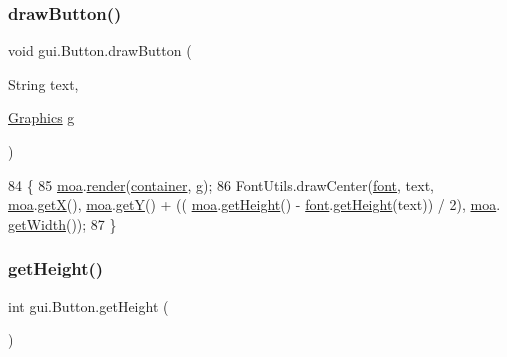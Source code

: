 \subsubsection{\texorpdfstring{draw\+Button()}{drawButton()}}
{\footnotesize\ttfamily void gui.\+Button.\+draw\+Button (\begin{DoxyParamCaption}\item[{String}]{text,  }\item[{\mbox{\hyperlink{classorg_1_1newdawn_1_1slick_1_1_graphics}{Graphics}}}]{g }\end{DoxyParamCaption})\hspace{0.3cm}{\ttfamily [inline]}}


\begin{DoxyCode}
84                                                     \{
85         \mbox{\hyperlink{classgui_1_1_button_abccfc83b8fee5280bf5022b3b211054e}{moa}}.\mbox{\hyperlink{classorg_1_1newdawn_1_1slick_1_1gui_1_1_mouse_over_area_a37b442cacc81eec200efb0fa76d86fe0}{render}}(\mbox{\hyperlink{classgui_1_1_button_a91cd8f6ba1fa010f564dcbc4561ce9a7}{container}}, g);
86         FontUtils.drawCenter(\mbox{\hyperlink{classgui_1_1_button_a7f22b2fc3bd45d47a55a2d3ef20e5452}{font}}, text, \mbox{\hyperlink{classgui_1_1_button_abccfc83b8fee5280bf5022b3b211054e}{moa}}.\mbox{\hyperlink{classorg_1_1newdawn_1_1slick_1_1gui_1_1_mouse_over_area_a2856fed67e12db6016846dca42316ddd}{getX}}(), \mbox{\hyperlink{classgui_1_1_button_abccfc83b8fee5280bf5022b3b211054e}{moa}}.\mbox{\hyperlink{classorg_1_1newdawn_1_1slick_1_1gui_1_1_mouse_over_area_aee9e2876cba8a5468425f1a70a3c0487}{getY}}() + ((
      \mbox{\hyperlink{classgui_1_1_button_abccfc83b8fee5280bf5022b3b211054e}{moa}}.\mbox{\hyperlink{classorg_1_1newdawn_1_1slick_1_1gui_1_1_mouse_over_area_a216ac5bebcca2e6437b0bbd832934d99}{getHeight}}() - \mbox{\hyperlink{classgui_1_1_button_a7f22b2fc3bd45d47a55a2d3ef20e5452}{font}}.\mbox{\hyperlink{classorg_1_1newdawn_1_1slick_1_1_unicode_font_a409f20ee363890da63571bbc46567808}{getHeight}}(text)) / 2), \mbox{\hyperlink{classgui_1_1_button_abccfc83b8fee5280bf5022b3b211054e}{moa}}.
      \mbox{\hyperlink{classorg_1_1newdawn_1_1slick_1_1gui_1_1_mouse_over_area_aaf39ffca45d9f2907f597f9e283f8eec}{getWidth}}());
87     \}
\end{DoxyCode}
\mbox{\label{classgui_1_1_button_aa1ef0f057ac241268c844a9b524309f8}} 
\subsubsection{\texorpdfstring{get\+Height()}{getHeight()}}
{\footnotesize\ttfamily int gui.\+Button.\+get\+Height (\begin{DoxyParamCaption}{ }\end{DoxyParamCaption})\hspace{0.3cm}{\ttfamily [inline]}}


